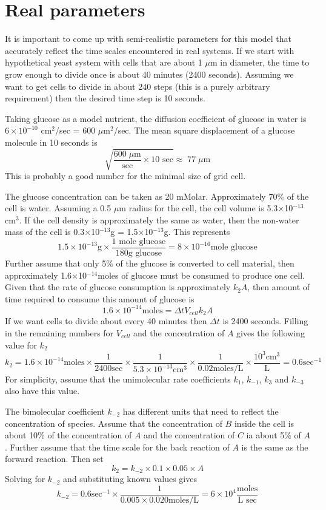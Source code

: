 \documentclass[12pt]{article}
\begin{document}
\section{Real parameters}
It is important to come up with semi-realistic parameters for this model that
accurately reflect the time scales encountered in real systems. If we start with
hypothetical yeast system with cells that are about 1 $\mu$m in diameter, the time
to grow enough to divide once is about 40 minutes (2400 seconds). Assuming we want
to get cells to divide in about 240 steps (this is a purely arbitrary requirement)
then the desired time step is 10 seconds.

Taking glucose as
a model nutrient, the diffusion coefficient of glucose in water is $6\times 10^{-10}$
cm$^2$/sec = 600 $\mu$m$^2$/sec. The mean square displacement of a glucose molecule
in 10 seconds is
\[
\sqrt{ \frac{600\;\mu\mathrm{m}}{\mbox{sec}}\times \mbox{10 sec}}
\approx\;77\;\mu\mathrm{m}
\]
This is probably a good number for the minimal size of grid cell.

The glucose concentration can be taken as 20 mMolar. Approximately 70\% of the cell is
water. Assuming a 0.5 $\mu$m radius for the cell, the cell volume is 5.3$\times$10$^{-13}$
cm$^3$. If the cell density is approximately the same as water, then the non-water mass of
the cell is 0.3$\times$10$^{-13}$g = 1.5$\times$10$^{-13}$g. This represents
\[
1.5\times 10^{-13}\mbox{g}\times\frac{\mbox{1 mole glucose}}{180\mbox{g glucose}} = 8\times 10^{-16}
\mbox{mole glucose}
\]
Further assume that only 5\% of the glucose is converted to cell material, then approximately
1.6$\times$10$^{-14}$moles of glucose must be consumed to produce one cell. Given that the rate of
glucose consumption is approximately $k_2 A$, then amount of time required to consume this
amount of glucose is
\[
1.6\times 10^{-14}\mbox{moles} = \Delta t V_{cell}k_2 A
\]
If we want cells to divide about every 40 minutes then $\Delta t$ is 2400 seconds. Filling in the
remaining numbers for $V_{cell}$ and the concentration of $A$ gives the following value for $k_2$
\[
k_2 = 1.6\times 10^{-14}\mbox{moles}\times\frac{1}{2400 \mbox{sec}}
\times\frac{1}{5.3\times 10^{-13}\mbox{cm}^3}
\times\frac{1}{0.02 \mbox{moles/L}}\times\frac{10^3\mbox{cm}^3}{\mbox{L}}= 0.6\mbox{sec}^{-1}
\]
For simplicity, assume that the
unimolecular rate coefficients $k_1$, $k_{-1}$, $k_3$ and $k_{-3}$ also have this
value.

The bimolecular coefficient $k_{-2}$ has different units that need to reflect the concentration
of species. Assume that the concentration of $B$ inside the cell is about 10\% of the concentration
of $A$ and the concentration of $C$ ia about 5\% of $A$. Further assume that the time scale for the
back reaction of $A$ is the same as the forward reaction. Then set
\[
k_2 = k_{-2}\times 0.1\times 0.05\times A
\]
Solving for $k_{-2}$ and substituting known values gives
\[
k_{-2} = 0.6\mbox{sec}^{-1}\times\frac{1}{ 0.005\times 0.020 \mbox{moles/L}}=6\times 10^4
\frac{\mbox{moles}}{\mbox{L sec}}
\]
\end{document}

